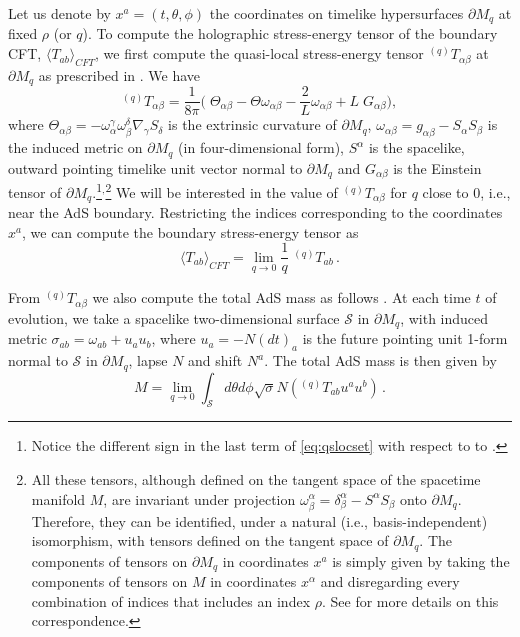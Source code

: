\documentclass[a4paper,11pt]{article}
\numberwithin{equation}{section}
\begin{document}
Let us denote by $x^a=(t,\theta,\phi)$ the coordinates on timelike hypersurfaces $\partial M_q$ at fixed $\rho$ (or $q$).
To compute the holographic stress-energy tensor of the boundary CFT, $\langle T_{ab}\rangle_{CFT}$, we first compute the quasi-local stress-energy tensor $^{(q)}T_{\alpha\beta}$ at $\partial M_q$ as prescribed in \cite{Balasubramanian:1999re}. 
We have
\begin{equation}
\label{eq:qslocset}
^{(q)}T_{\alpha\beta}=\frac{1}{8\pi}\biggl(\;  \Theta_{\alpha\beta}-\Theta \omega_{\alpha\beta}-\frac{2}{L}\omega_{\alpha\beta}+L \;G_{\alpha\beta} \biggr),
\end{equation}
where $\Theta_{\alpha\beta}=-\omega^\gamma_{\alpha}\omega^\delta_\beta\nabla_{\gamma}S_{\delta}$ is the extrinsic curvature of $\partial M_q$, $\omega_{\alpha\beta}=g_{\alpha\beta}-S_\alpha S_\beta$ is the induced metric on $\partial M_q$ (in four-dimensional form), $S^\alpha$ is the spacelike, outward pointing timelike unit vector normal to $\partial M_q$ and $G_{\alpha\beta}$ is the Einstein tensor of $\partial M_q$.\footnote{Notice the different sign in the last term of \eqref{eq:qslocset} with respect to to \cite{Balasubramanian:1999re}.}$^{,}$\footnote{All these tensors, although defined on the tangent space of the spacetime manifold $M$, are invariant under projection $\omega^\alpha_{\beta}=\delta^\alpha_{\beta}-S^\alpha S_\beta$ onto $\partial M_q$. Therefore, they can be identified, under a natural (i.e., basis-independent) isomorphism, with tensors defined on the tangent space of $\partial M_q$. The components of tensors on $\partial M_q$ in coordinates $x^a$ is simply given by taking the components of tensors on $M$ in coordinates $x^\alpha$ and disregarding every combination of indices that includes an index $\rho$. See \cite{Hawking:1973uf} for more details on this correspondence.} We will be interested in the value of $^{(q)}T_{\alpha\beta}$ for $q$ close to 0, i.e., near the AdS boundary.
Restricting the indices corresponding to the coordinates $x^a$, we can compute the boundary stress-energy tensor as
\begin{equation}
\langle T_{ab}\rangle_{CFT}=\lim_{q\to0}\frac{1}{q} \;^{(q)}T_{ab}\,.
\end{equation}

From $^{(q)}T_{\alpha\beta}$ we also compute the total AdS mass as follows \cite{Balasubramanian:1999re}. At each time $t$ of evolution, we take a spacelike two-dimensional surface $\mathcal{S}$ in $\partial M_q$, with induced metric $\sigma_{ab}=\omega_{ab}+u_a u_b$, where $u_a=-N(dt)_a$ is the future pointing unit 1-form normal to $\mathcal{S}$ in $\partial M_q$, lapse $N$ and shift $N^a$. The total AdS mass is then given by
\begin{equation}
M=\lim_{q\to0}\int_{\mathcal{S}} d\theta d\phi \sqrt{\sigma} N ( ^{(q)}T_{ab} u^a u^b)\,.
\end{equation}
\end{document}
